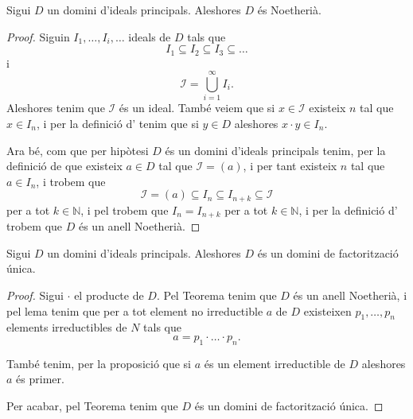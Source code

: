 \documentclass[../../Main.tex]{subfiles}
\begin{document}
	\begin{theorem}
		\label{thm:DIP es Noetherià}
		Sigui \(D\) un domini d'ideals principals. Aleshores \(D\) és Noetherià.
		\begin{proof}
			Siguin \(I_{1},\dots,I_{i},\dots\) ideals de \(D\) tals que
			\[I_{1}\subseteq I_{2}\subseteq I_{3}\subseteq\dots\]
			i
			\[\mathcal{I}=\bigcup_{i=1}^{\infty}I_{i}.\]
			Aleshores tenim que \(\mathcal{I}\) és un ideal. També veiem que si \(x\in\mathcal{I}\) existeix \(n\) tal que \(x\in I_{n}\), i per la definició d' tenim que si \(y\in D\) aleshores \(x\cdot y\in I_{n}\).
			
			Ara bé, com que per hipòtesi \(D\) és un domini d'ideals principals tenim, per la definició de  que existeix \(a\in D\) tal que \(\mathcal{I}=(a)\), i per tant existeix \(n\) tal que \(a\in I_{n}\), i trobem que
			\[\mathcal{I}=(a)\subseteq I_{n}\subseteq I_{n+k}\subseteq\mathcal{I}\]
			per a tot \(k\in\mathbb{N}\), i pel  trobem que \(I_{n}=I_{n+k}\) per a tot \(k\in\mathbb{N}\), i per la definició d' trobem que \(D\) és un anell Noetherià.
		\end{proof}
	\end{theorem}
	\begin{theorem}
		\label{thm:DIP és DFU}
		Sigui \(D\) un domini d'ideals principals. Aleshores \(D\) és un domini de factorització única.
		\begin{proof}
			Sigui \(\cdot\) el producte de \(D\). Pel Teorema  tenim que \(D\) és un anell Noetherià, i pel lema  tenim que per a tot element no irreductible \(a\) de \(D\) existeixen \(p_{1},\dots,p_{n}\) elements irreductibles de \(N\) tals que
			\[a=p_{1}\cdot\ldots\cdot p_{n}.\]
			
			També tenim, per la proposició  que si \(a\) és un element irreductible de \(D\) aleshores \(a\) és primer.
			
			Per acabar, pel Teorema  tenim que \(D\) és un domini de factorització única.
		\end{proof}
	\end{theorem}
\end{document}
